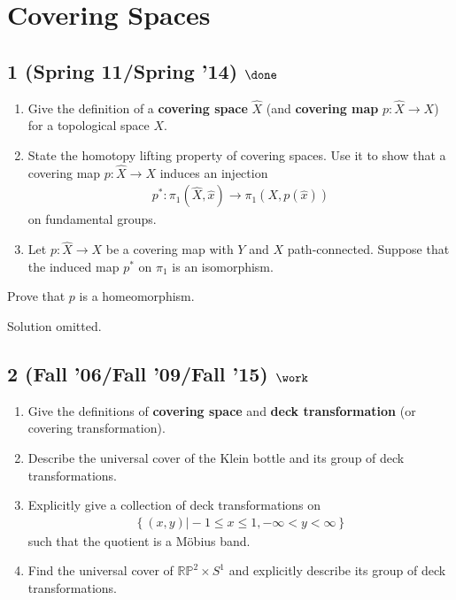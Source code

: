 \hypertarget{covering-spaces}{%
\section{Covering Spaces}\label{covering-spaces}}

\hypertarget{spring-11spring-14-done}{%
\subsection{\texorpdfstring{1 (Spring 11/Spring '14)
\(\done\)}{1 (Spring 11/Spring '14) \textbackslash done}}\label{spring-11spring-14-done}}

\begin{enumerate}
\def\labelenumi{\alph{enumi}.}
\item
  Give the definition of a \textbf{covering space} \(\widehat{X}\) (and
  \textbf{covering map} \(p : \widehat{X} \to X\)) for a topological
  space \(X\).
\item
  State the homotopy lifting property of covering spaces. Use it to show
  that a covering map \(p : \widehat{X} \to X\) induces an injection
  \begin{align*}
  p^\ast : \pi_1 (\widehat{X}, \widehat{x}) \to \pi_1 (X, p(\widehat{x}))
  \end{align*}
  on fundamental groups.
\item
  Let \(p : \widehat{X} \to X\) be a covering map with \(Y\) and \(X\)
  path-connected. Suppose that the induced map \(p^\ast\) on \(\pi_1\)
  is an isomorphism.
\end{enumerate}

Prove that \(p\) is a homeomorphism.


Solution omitted.

\hypertarget{fall-06fall-09fall-15-work}{%
\subsection{\texorpdfstring{2 (Fall '06/Fall '09/Fall '15)
\(\work\)}{2 (Fall '06/Fall '09/Fall '15) \textbackslash work}}\label{fall-06fall-09fall-15-work}}

\begin{enumerate}
\def\labelenumi{\alph{enumi}.}
\item
  Give the definitions of \textbf{covering space} and \textbf{deck
  transformation} (or covering transformation).
\item
  Describe the universal cover of the Klein bottle and its group of deck
  transformations.
\item
  Explicitly give a collection of deck transformations on
  \begin{align*}\left\{{(x, y) \mathrel{\Big|}-1 \leq x \leq 1, -\infty < y < \infty}\right\}\end{align*}
  such that the quotient is a Möbius band.
\item
  Find the universal cover of \({\mathbb{RP}}^2 \times S^1\) and
  explicitly describe its group of deck transformations.
\end{enumerate}

